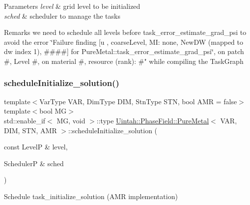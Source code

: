 \begin{DoxyParams}{Parameters}
{\em level} & grid level to be initialized \\
\hline
{\em sched} & scheduler to manage the tasks\\
\hline
\end{DoxyParams}
\begin{DoxyRemark}{Remarks}
we need to schedule all levels before task\+\_\+error\+\_\+estimate\+\_\+grad\+\_\+psi to avoid the error \char`\"{}\+Failure finding \mbox{[}u , coarse\+Level, M\+I\+: none, New\+D\+W
(mapped to dw index 1), \#\#\#\#\mbox{]} for Pure\+Metal\+::task\+\_\+error\+\_\+estimate\+\_\+grad\+\_\+psi\char`\"{}, on patch \#, Level \#, on material \#, resource (rank)\+: \#" while compiling the Task\+Graph 
\end{DoxyRemark}
\mbox{\label{classUintah_1_1PhaseField_1_1PureMetal_a1af29773c5193a9dbb14ff3988bba4fd}} 
\subsubsection{\texorpdfstring{schedule\+Initialize\+\_\+solution()}{scheduleInitialize\_solution()}\hspace{0.1cm}{\footnotesize\ttfamily [2/2]}}
{\footnotesize\ttfamily template$<$Var\+Type V\+AR, Dim\+Type D\+IM, Stn\+Type S\+TN, bool A\+MR = false$>$ \\
template$<$bool MG$>$ \\
std\+::enable\+\_\+if$<$ MG, void $>$\+::type \hyperlink{classUintah_1_1PhaseField_1_1PureMetal}{Uintah\+::\+Phase\+Field\+::\+Pure\+Metal}$<$ V\+AR, D\+IM, S\+TN, A\+MR $>$\+::schedule\+Initialize\+\_\+solution (\begin{DoxyParamCaption}\item[{const LevelP \&}]{level,  }\item[{SchedulerP \&}]{sched }\end{DoxyParamCaption})\hspace{0.3cm}{\ttfamily [protected]}}



Schedule task\+\_\+initialize\+\_\+solution (A\+MR implementation) 

